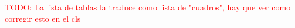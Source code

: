 \documentclass[
	12pt, %
	spanish, %
	singlespacing, %
	headsepline, %
	]{MastersDoctoralThesis} %
\newcommand\myworries[1]{\textcolor{red}{#1}} %
\begin{document}

\tableofcontents %

\listoffigures %

\listoftables %
\myworries{TODO: La lista de tablas la traduce como lista de "cuadros", hay  que ver como corregir esto en el cls}\\\\

\end{document}
